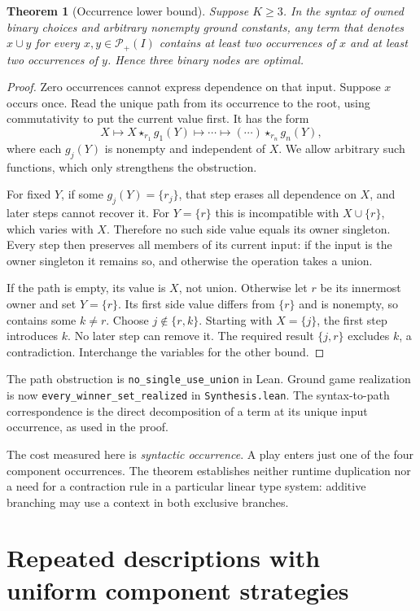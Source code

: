 \documentclass[11pt]{article}
\newtheorem{theorem}{Theorem}[section]
\newcommand{\ow}[1]{\mathbin{\star_{#1}}}
\newcommand{\Pow}{\mathcal P_{+}}
\begin{document}
\begin{theorem}[Occurrence lower bound]\label{thm:lower}
Suppose $K\geq3$. In the syntax of owned binary choices and arbitrary
nonempty ground constants, any term that denotes $x\cup y$ for every
$x,y\in\Pow(I)$ contains at least two occurrences of $x$ and at least two
occurrences of $y$. Hence three binary nodes are optimal.
\end{theorem}
\begin{proof}
Zero occurrences cannot express dependence on that input. Suppose $x$
occurs once. Read the unique path from its occurrence to the root, using
commutativity to put the current value first. It has the form
\[
 X\longmapsto X\ow{r_1}g_1(Y)
   \longmapsto\cdots\longmapsto (\cdots)\ow{r_n}g_n(Y),
\]
where each $g_j(Y)$ is nonempty and independent of $X$. We allow arbitrary
such functions, which only strengthens the obstruction.

For fixed $Y$, if some $g_j(Y)=\{r_j\}$, that step erases all dependence
on $X$, and later steps cannot recover it. For $Y=\{r\}$ this is
incompatible with $X\cup\{r\}$, which varies with $X$. Therefore no such
side value equals its owner singleton. Every step then preserves all
members of its current input: if the input is the owner singleton it
remains so, and otherwise the operation takes a union.

If the path is empty, its value is $X$, not union. Otherwise let $r$ be
its innermost owner and set $Y=\{r\}$. Its first side value differs from
$\{r\}$ and is nonempty, so contains some $k\ne r$. Choose
$j\notin\{r,k\}$. Starting with $X=\{j\}$, the first step introduces
$k$. No later step can remove it. The required result $\{j,r\}$ excludes
$k$, a contradiction. Interchange the variables for the other bound.
\end{proof}

The path obstruction is \texttt{no\_single\_use\_union} in Lean. Ground
game realization is now \texttt{every\_winner\_set\_realized} in
\texttt{Synthesis.lean}. The
syntax-to-path correspondence is the direct decomposition of a term at
its unique input occurrence, as used in the proof.

The cost measured here is \emph{syntactic occurrence}. A play enters just
one of the four component occurrences. The theorem establishes neither
runtime duplication nor a need for a contraction rule in a particular
linear type system: additive branching may use a context in both
exclusive branches.

\section{Repeated descriptions with uniform component strategies}
\end{document}
